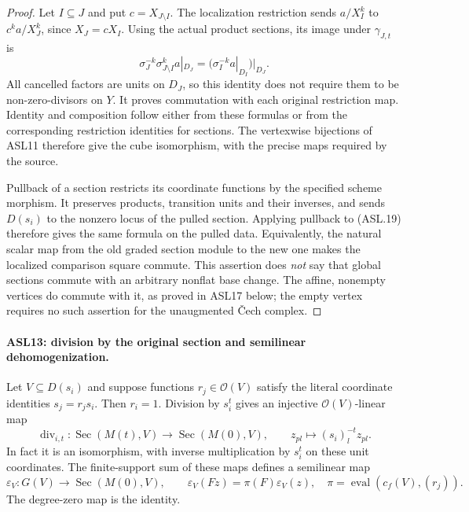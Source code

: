 \begin{proof}
Let $I\subseteq J$ and put $c=X_{J\setminus I}$.
The localization restriction sends
$a/X_I^k$ to $c^ka/X_J^k$, since $X_J=cX_I$.
Using the actual product sections, its image under $\gamma_{J,t}$
is
\[
 \sigma_J^{-k}\sigma_{J\setminus I}^{k}a|_{D_J}
       =\bigl(\sigma_I^{-k}a|_{D_I}\bigr)|_{D_J}.
                                                        \tag{ASL.21}
\]
All cancelled factors are units on $D_J$, so this identity
does not require them to be non-zero-divisors on $Y$.
It proves commutation with each original restriction map.
Identity and composition follow either from these formulas or
from the corresponding restriction identities for sections.
The vertexwise bijections of ASL11 therefore give the cube
isomorphism, with the precise maps required by the source.

Pullback of a section restricts its coordinate functions by the
specified scheme morphism.  It preserves products, transition
units and their inverses, and sends $D(s_i)$ to the nonzero
locus of the pulled section.  Applying pullback to (ASL.19)
therefore gives the same formula on the pulled data.  Equivalently,
the natural scalar map from the old graded section module to
the new one makes the localized comparison square commute.
This assertion does \emph{not} say that global sections commute
with an arbitrary nonflat base change.  The affine, nonempty
vertices do commute with it, as proved in ASL17 below; the
empty vertex requires no such assertion for the unaugmented
\v Cech complex.
\end{proof}

\paragraph{ASL13: division by the original section and semilinear dehomogenization.}
\label{claim:ASL13}
Let $V\subseteq D(s_i)$ and suppose functions
$r_j\in\mathcal O(V)$ satisfy the literal coordinate identities
$s_j=r_js_i$.  Then $r_i=1$.  Division by $s_i^t$ gives an
injective $\mathcal O(V)$-linear map
\[
 \operatorname{div}_{i,t}:\operatorname{Sec}(M(t),V)
                         \longrightarrow\operatorname{Sec}(M(0),V),
 \qquad z_{pl}\longmapsto(s_i)_l^{-t}z_{pl}.
                                                        \tag{ASL.22}
\]
In fact it is an isomorphism, with inverse multiplication by
$s_i^t$ on these unit coordinates.  The finite-support sum of
these maps defines a semilinear map
\[
 \varepsilon_V:G(V)\longrightarrow\operatorname{Sec}(M(0),V),
 \qquad \varepsilon_V(Fz)=\pi(F)\varepsilon_V(z),
 \quad \pi=\operatorname{eval}(c_f(V),(r_j)).        \tag{ASL.23}
\]
The degree-zero map is the identity.

